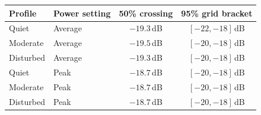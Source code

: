 \begin{tabular}{@{}llcc@{}}\toprule
Profile & Power setting & 50\% crossing & 95\% grid bracket \\
\midrule
Quiet & Average & $-19.3$\,dB & $[-22, -18]$\,dB \\
Moderate & Average & $-19.5$\,dB & $[-20, -18]$\,dB \\
Disturbed & Average & $-19.3$\,dB & $[-20, -18]$\,dB \\
Quiet & Peak & $-18.7$\,dB & $[-20, -18]$\,dB \\
Moderate & Peak & $-18.7$\,dB & $[-20, -18]$\,dB \\
Disturbed & Peak & $-18.7$\,dB & $[-20, -18]$\,dB \\
\bottomrule\end{tabular}
